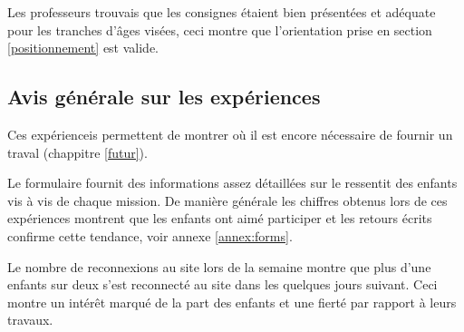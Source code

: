 Les professeurs trouvais que les consignes étaient bien présentées et adéquate pour les tranches d'âges visées, ceci montre que l'orientation prise en section \ref{positionnement} est valide.



\subsection{Avis générale sur les expériences}
Ces expérienceis permettent de montrer où il est encore nécessaire de fournir un traval (chappitre \ref{futur}).

Le formulaire fournit des informations assez détaillées sur le ressentit des enfants vis à vis de chaque mission. De manière générale les chiffres obtenus lors de ces expériences montrent que les enfants ont aimé participer et les retours écrits confirme cette tendance, voir annexe \ref{annex:forms}.

Le nombre de reconnexions au site lors de la semaine montre que plus d'une enfants sur deux s'est reconnecté au site dans les quelques jours suivant. Ceci montre un intérêt marqué de la part des enfants et une fierté par rapport à leurs travaux.
